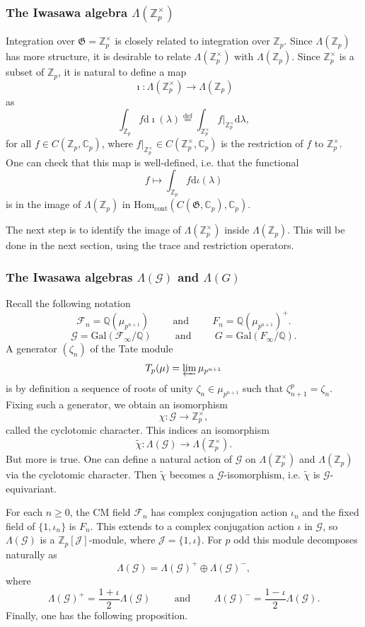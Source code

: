 \documentclass[twoside,10pt]{article}
\newcommand{\rarr}{\rightarrow}
\newcommand{\myand}{\hspace{1cm}\text{and}\hspace{1cm}}
\newcommand{\Z}{\mathbb{Z}}
\newcommand{\Q}{\mathbb{Q}}
\newcommand{\C}{\mathbb{C}}
\newcommand{\Gfrak}{\mathfrak{G}}
\newcommand{\curlG}{\mathcal{G}}
\newcommand{\curlF}{\mathcal{F}}
\newcommand{\eqdef}{\overset{\text{def}}{=}}
\newcommand{\Hom}{\text{Hom}}
\newcommand{\Gal}{\text{Gal}}
\renewcommand{\d}{\text{d}}
\begin{document}
\subsubsection*{The Iwasawa algebra $\Lambda(\Z_p^\times)$}
Integration over $\Gfrak=\Z_p^\times$ is closely related to integration over $\Z_p$. Since $\Lambda(\Z_p)$ has more structure, it is desirable to relate $\Lambda(\Z_p^\times)$ with $\Lambda(\Z_p)$. Since $\Z_p^\times$ is a subset of $\Z_p$, it is natural to define a map
\[\imath:\Lambda(\Z_p^\times)\rarr\Lambda(\Z_p)\]
as
\[\int_{\Z_p}f\d\imath(\lambda)\eqdef\int_{\Z_p^\times}f|_{\Z_p^\times}\d\lambda,\]
for all $f\in C(\Z_p,\C_p)$, where $f|_{\Z_p^\times}\in C(\Z_p^\times,\C_p)$ is the restriction of $f$ to $\Z_p^\times$. One can check that this map is well-defined, i.e. that the functional 
\[f\mapsto \int_{\Z_p}f\d\iota(\lambda)\]
is in the image of $\Lambda(\Z_p)$ in $\Hom_{\text{cont}}(C(\Gfrak,\C_p),\C_p)$.

The next step is to identify the image of $\Lambda(\Z_p^\times)$ inside $\Lambda(\Z_p)$. This will be done in the next section, using the trace and restriction operators. 

\subsubsection*{The Iwasawa algebras $\Lambda(\curlG)$ and $\Lambda(G)$}
Recall the following notation
\[\curlF_n=\Q(\mu_{p^{n+1}})\myand F_n=\Q(\mu_{p^{n+1}})^+.\]
\[\curlG=\Gal(\curlF_\infty/\Q)\myand G=\Gal(F_\infty/\Q).\]
A generator $(\zeta_n)$ of the Tate module 
\[T_p(\mu)=\varprojlim\mu_{p^{n+1}}\]
is by definition a sequence of roots of unity $\zeta_n\in\mu _{p^{n+1}}$ such that $\zeta_{n+1}^p=\zeta_n$. Fixing such a generator, we obtain an isomorphism
\[\chi:\curlG\rarr\Z_p^\times,\]
called the cyclotomic character. This indices an isomorphism
\[\tilde{\chi}:\Lambda(\curlG)\rarr\Lambda(\Z_p^\times).\]
But more is true. One can define a natural action of $\curlG$ on $\Lambda(\Z_p^\times)$ and $\Lambda(\Z_p)$ via the cyclotomic character. Then $\tilde{\chi}$ becomes a $\curlG$-isomorphism, i.e. $\tilde{\chi}$ is $\curlG$-equivariant.

For each $n\geq0$, the CM field $\curlF_n$ has complex conjugation action $\iota_n$ and the fixed field of $\{1,\iota_n\}$ is $F_n$. This extends to a complex conjugation action $\iota$ in $\curlG$, so $\Lambda(\curlG)$ is a $\Z_p[\mathcal{J}]$-module, where $\mathcal{J}=\{1,\iota\}$. For $p$ odd this module decomposes naturally as
\[\Lambda(\curlG)=\Lambda(\curlG)^+\oplus\Lambda(\curlG)^-,\]
where
\[\Lambda(\curlG)^+=\frac{1+\iota}{2}\Lambda(\curlG)\myand\Lambda(\curlG)^-=\frac{1-\iota}{2}\Lambda(\curlG).\]
Finally, one has the following proposition.
\end{document}
